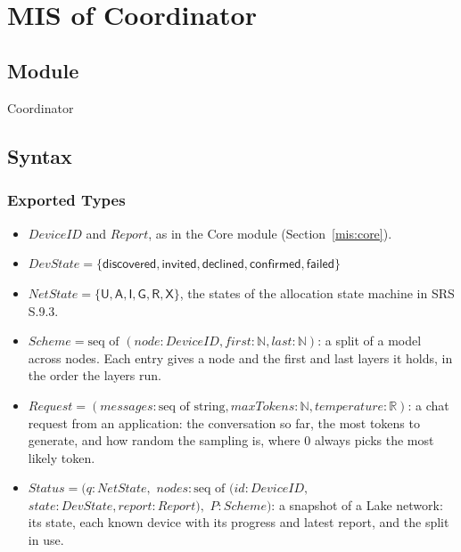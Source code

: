 \documentclass[12pt, titlepage]{article}
\begin{document}
\newpage
~\newpage

\section{MIS of Coordinator} \label{mis:coordinator}

\subsection{Module}

Coordinator

\subsection{Syntax}

\subsubsection{Exported Types}

\begin{itemize}
  \item $\mathit{DeviceID}$ and $\mathit{Report}$, as in the Core module
    (Section~\ref{mis:core}).
  \item $\mathit{DevState} = \{\mathsf{discovered}, \mathsf{invited},
    \mathsf{declined}, \mathsf{confirmed}, \mathsf{failed}\}$
  \item $\mathit{NetState} = \{\mathsf{U}, \mathsf{A}, \mathsf{I}, \mathsf{G},
    \mathsf{R}, \mathsf{X}\}$, the states of the allocation state machine in SRS
    S.9.3.
  \item $\mathit{Scheme} = \text{seq of } (\mathit{node}: \mathit{DeviceID},
    \mathit{first}: \mathbb{N}, \mathit{last}: \mathbb{N})$: a split of a model
    across nodes. Each entry gives a node and the first and last layers it
    holds, in the order the layers run.
  \item $\mathit{Request} = (\mathit{messages}: \text{seq of string},
    \mathit{maxTokens}: \mathbb{N}, \mathit{temperature}: \mathbb{R})$: a chat
    request from an application: the conversation so far,
    the most tokens to generate, and how random the sampling is, where 0 always
    picks the most likely token.
  \item $\mathit{Status} = (q: \mathit{NetState},$
    $\mathit{nodes}: \text{seq of } (\mathit{id}: \mathit{DeviceID},$
    $\mathit{state}: \mathit{DevState}, \mathit{report}: \mathit{Report}),$
    $P: \mathit{Scheme})$: a snapshot of a
    Lake network: its state, each known device with its progress and latest
    report, and the split in use.
\end{itemize}
\end{document}
